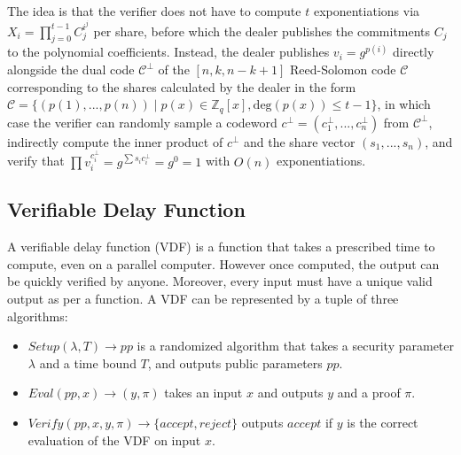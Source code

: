 \documentclass[11pt]{article}
\theoremstyle{definition}
\theoremstyle{remark}
\begin{document}
The idea is that the verifier does not have to compute $t$ exponentiations via $X_i = \prod_{j = 0}^{t - 1} C_j^{i^j}$ per share, before which the dealer publishes the commitments $C_j$ to the polynomial coefficients. Instead, the dealer publishes $v_i = g^{p(i)}$ directly alongside the dual code $\mathcal{C}^\perp$ of the $[n, k, n - k + 1]$ Reed-Solomon code $\mathcal{C}$ corresponding to the shares calculated by the dealer in the form $\mathcal{C} = \{(p(1), ..., p(n)) \mid p(x) \in \mathbb{Z}_q[x], \text{deg}(p(x)) \leq t - 1\}$, in which case the verifier can randomly sample a codeword $c^\perp = (c_1^\perp, ..., c_n^\perp)$ from $\mathcal{C}^\perp$, indirectly compute the inner product of $c^\perp$ and the share vector $(s_1, ..., s_n)$, and verify that $\prod v_i^{c_i^\perp} = g^{\sum s_i c_i^\perp} = g^0 = 1$ with $O(n)$ exponentiations.


\subsection{Verifiable Delay Function}
A verifiable delay function (VDF) is a function that takes a prescribed time to compute, even on a parallel computer. However once computed, the output can be quickly verified by anyone. Moreover, every input must have a unique valid output as per a function. A VDF can be represented by a tuple of three algorithms:
\begin{itemize}
\item $Setup(\lambda, T) \rightarrow pp$ is a randomized algorithm that takes a security parameter $\lambda$ and a time bound $T$, and outputs public parameters $pp$.
\item $Eval(pp, x) \rightarrow (y, \pi)$ takes an input $x$ and outputs $y$ and a proof $\pi$.
\item $Verify(pp, x, y, \pi) \rightarrow \{accept, reject\}$ outputs $accept$ if $y$ is the correct evaluation of the VDF on input $x$.
\end{itemize}
\end{document}
